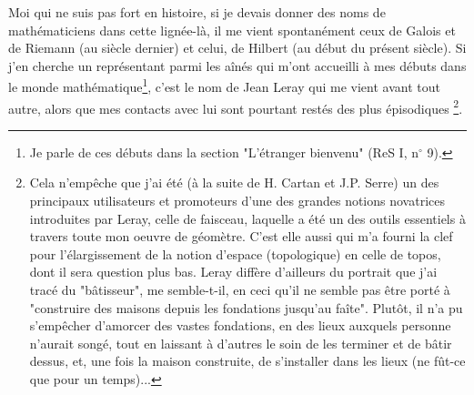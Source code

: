 Moi qui ne suis pas fort en histoire, si je devais donner des noms de mathématiciens dans cette lignée-là, il me vient spontanément ceux de Galois et de Riemann (au siècle dernier) et celui, de Hilbert (au début du présent siècle). Si j'en cherche un représentant parmi les aînés qui m'ont accueilli à mes débuts dans le monde mathématique\footnote{Je parle de ces débuts dans la section "L'étranger bienvenu" (ReS I, n$^{\circ}$ 9).}, c'est le nom de Jean Leray qui me vient avant tout autre, alors que mes contacts avec lui sont pourtant restés des plus épisodiques \footnote{Cela n'empêche que j'ai été (à la suite de H. Cartan et J.P. Serre) un des principaux utilisateurs et promoteurs d'une des grandes notions novatrices introduites par Leray, celle de faisceau, laquelle a été un des outils essentiels à travers toute mon oeuvre de géomètre. C'est elle aussi qui m'a fourni la clef pour l'élargissement de la notion d'espace (topologique) en celle de topos, dont il sera question plus bas.
Leray diffère d'ailleurs du portrait que j'ai tracé du "bâtisseur", me semble-t-il, en ceci qu'il ne semble pas être porté à "construire des maisons depuis les fondations jusqu'au faîte". Plutôt, il n'a pu s'empêcher d'amorcer des vastes fondations, en des lieux auxquels personne n'aurait songé, tout en laissant à d'autres le soin de les terminer et de bâtir dessus, et, une fois la maison construite, de s'installer dans les lieux (ne fût-ce que pour un temps)...}.

